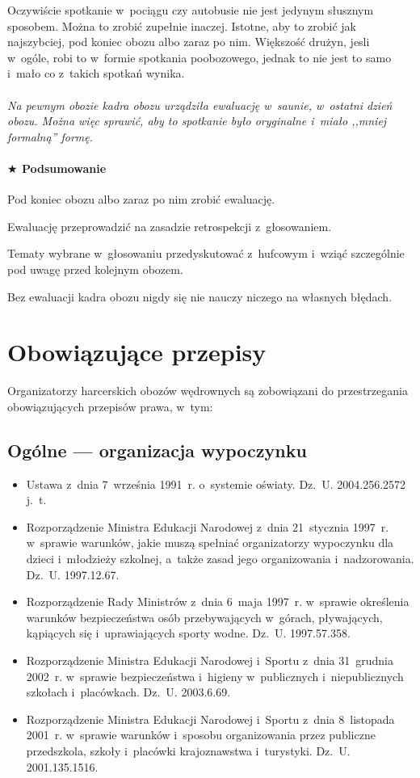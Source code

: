 \documentclass[a5paper,10pt,titlepage,twoside]{article}
\newcommand*{\thecheckbox}{\hss$\Box$} %
\newenvironment*{checklist}
{\list{}{%
\renewcommand*{\makelabel}[1]{\thecheckbox}}}
{\endlist}
\begin{document}
Oczywiście spotkanie w~pociągu czy autobusie nie jest jedynym słusznym sposobem. Można to zrobić zupełnie inaczej. Istotne, aby to zrobić jak najszybciej, pod koniec obozu albo zaraz po nim. Większość drużyn, jesli w~ogóle, robi to w~formie spotkania poobozowego, jednak to nie jest to samo i~mało co z~takich spotkań wynika.
\\
\\
\small{
\emph{Na pewnym obozie kadra obozu urządziła ewaluację w~saunie, w~ostatni dzień obozu. Można więc sprawić, aby to spotkanie było oryginalne i~miało ,,mniej formalną'' formę.}}
\paragraph{$\bigstar$ Podsumowanie}
\begin{checklist}
\item Pod koniec obozu albo zaraz po nim zrobić ewaluację.
\item Ewaluację przeprowadzić na zasadzie retrospekcji z~głosowaniem.
\item Tematy wybrane w~głosowaniu przedyskutować z~hufcowym i~wziąć szczególnie pod uwagę przed kolejnym obozem.
\item Bez ewaluacji kadra obozu nigdy się nie nauczy niczego na własnych błędach.
\end{checklist}
\cleardoublepage
\section{Obowiązujące przepisy}
Organizatorzy harcerskich obozów wędrownych są zobowiązani do przestrzegania obowiązujących przepisów prawa, w~tym:
\subsection{Ogólne --- organizacja wypoczynku}
\begin{itemize}
\item Ustawa z~dnia 7~września 1991~r. o~systemie oświaty. Dz.~U. 2004.256.2572 j.~t.
\item Rozporządzenie Ministra Edukacji Narodowej z~dnia 21~stycznia 1997~r. w~sprawie warunków, jakie muszą spełniać organizatorzy wypoczynku dla dzieci i~młodzieży szkolnej, a~także zasad jego organizowania i~nadzorowania. Dz.~U. 1997.12.67.
\item Rozporządzenie Rady Ministrów z~dnia 6~maja 1997~r. w~sprawie określenia warunków bezpieczeństwa osób przebywających w~górach, pływających, kąpiących się i~uprawiających sporty wodne. Dz.~U. 1997.57.358.
\item Rozporządzenie Ministra Edukacji Narodowej i~Sportu z~dnia 31~grudnia 2002~r. w~sprawie bezpieczeństwa i~higieny w~publicznych i~niepublicznych szkołach i~placówkach. Dz.~U. 2003.6.69.
\item Rozporządzenie Ministra Edukacji Narodowej i~Sportu z~dnia 8~listopada 2001~r. w~sprawie warunków i~sposobu organizowania przez publiczne przedszkola, szkoły i~placówki krajoznawstwa i~turystyki. Dz.~U. 2001.135.1516.
\end{itemize}
\end{document}
